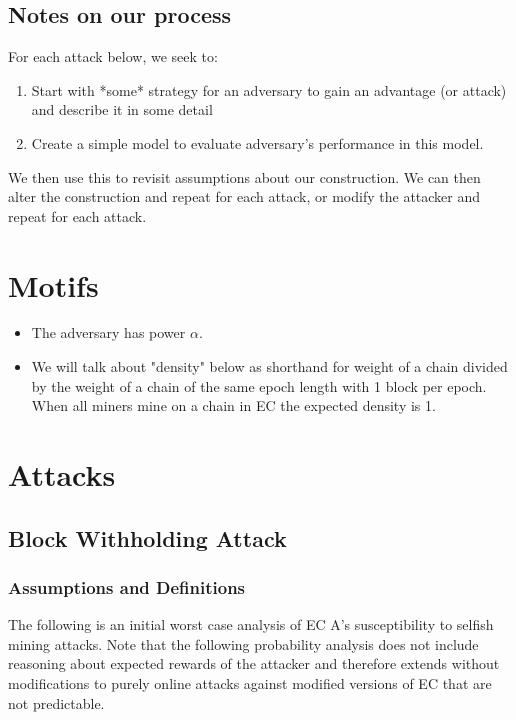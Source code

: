\documentclass{article}
\begin{document}
\subsection{Notes on our process}

For each attack below, we seek to:
\begin{enumerate} 
    \item Start with *some* strategy for an adversary to gain an advantage (or attack) and describe it in some detail
    \item Create a simple model to evaluate adversary's performance in this model. 
\end{enumerate}
    
We then use this to revisit assumptions about our construction. We can then alter the construction and repeat for each attack, or modify the attacker and repeat for each attack.

\section{Motifs}
\begin{itemize}
   \item The adversary has power $\alpha$.
\item We will talk about "density" below as shorthand for weight of a chain divided by the weight of a chain of the same epoch length with 1 block per epoch.  When all miners mine on a chain in EC the expected density is 1.
\end{itemize}


\section{Attacks}

\subsection{Block Withholding Attack}

\subsubsection{Assumptions and Definitions}
The following is an initial worst case analysis of EC A's susceptibility to selfish mining attacks.  Note that the following probability analysis does not include reasoning about expected rewards of the attacker and therefore extends without modifications to purely online attacks against modified versions of EC that are not predictable.
\end{document}
